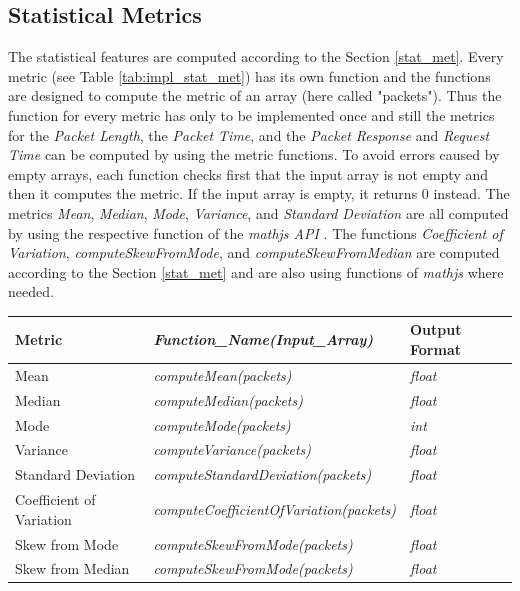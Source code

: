 \subsection{Statistical Metrics} \label{stat_met_impl}
The statistical features are computed according to the Section \ref{stat_met}. Every metric (see Table \ref{tab:impl_stat_met}) has its own function and the functions are designed to compute the metric of an array (here called "packets"). Thus the function for every metric has only to be implemented once and still the metrics for the \textit{Packet Length}, the \textit{Packet Time}, and the \textit{Packet Response} and \textit{Request Time} can be computed by using the metric functions. To avoid errors caused by empty arrays, each function checks first that the input array is not empty and then it computes the metric. If the input array is empty, it returns 0 instead. The metrics \textit{Mean}, \textit{Median}, \textit{Mode}, \textit{Variance}, and \textit{Standard Deviation} are all computed by using the respective function of the \textit{mathjs API} \cite{mathjs}. The functions \textit{Coefficient of Variation}, \textit{computeSkewFromMode}, and \textit{computeSkewFromMedian} are computed according to the Section \ref{stat_met} and are also using functions of \textit{mathjs} where needed.

\begin{center}
\begin{tabular}{ |l|l|l| }
\hline
Metric & \textit{Function\_Name(Input\_Array)} & Output Format\\
\hline
Mean & \textit{computeMean(packets)} & \textit{float} \\
\hline
Median & \textit{computeMedian(packets)} & \textit{float} \\
\hline
Mode & \textit{computeMode(packets)} & \textit{int} \\
\hline
Variance & \textit{computeVariance(packets)} & \textit{float} \\
\hline
Standard Deviation & \textit{computeStandardDeviation(packets)} & \textit{float} \\
\hline
Coefficient of Variation & \textit{computeCoefficientOfVariation(packets)} & \textit{float} \\
\hline
Skew from Mode & \textit{computeSkewFromMode(packets)} & \textit{float} \\
\hline
Skew from Median & \textit{computeSkewFromMode(packets)} & \textit{float} \\
\hline
\end{tabular}
\label{tab:impl_stat_met}
\end{center}

